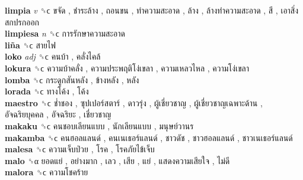 \textbf{limpia} \emph{v}  ␝ϲ   ขจัด ,  ชำระล้าง ,  ถอนขน ,  ทำความสะอาด ,  ล้าง ,  ล้างทำความสะอาด ,  สี ,  เอาสิ่งสกปรกออก   \\
\textbf{limpiesa} \emph{n}  ␝ϲ   การรักษาความสะอาด   \\
\textbf{liña} ␝ϲ   สายไฟ   \\
\textbf{loko} \emph{adj}  ␝ϲ   คนบ้า ,  คลั่งไคล้   \\
\textbf{lokura} ␝ϲ   ความบ้าคลั่ง ,  ความประพฤติโง่เขลา ,  ความเหลวไหล ,  ความโง่เขลา   \\
\textbf{lomba} ␝ϲ   กระดูกสันหลัง ,  ข้างหลัง ,  หลัง   \\
\textbf{lorada} ␝ϲ   ทางโค้ง ,  โค้ง   \\
\textbf{maestro} ␝ϲ   ช่ำชอง ,  ซุปเปอร์สตาร์ ,  ดาวรุ่ง ,  ผู้เชี่ยวชาญ ,  ผู้เชี่ยวชาญเฉพาะด้าน ,  อัจฉริยบุคคล ,  อัจฉริยะ ,  เชี่ยวชาญ   \\
\textbf{makaku} ␝ϲ   คนชอบเลียนแบบ ,  นักเลียนแบบ ,  มนุษย์วานร   \\
\textbf{makamba} ␝ϲ   คนฮอลแลนด์ ,  คนเนเธอร์แลนด์ ,  ชาวดัช ,  ชาวฮอลแลนด์ ,  ชาวเนเธอร์แลนด์   \\
\textbf{malesa} ␝ϲ   ความเจ็บป่วย ,  โรค ,  โรคภัยไข้เจ็บ   \\
\textbf{malo} ␝α   ยอดแย่ ,  อย่างมาก ,  เลว ,  เสีย ,  แย่ ,  แสดงความเสียใจ ,  ไม่ดี   \\
\textbf{malora} ␝ϲ   ความโชคร้าย   \\
